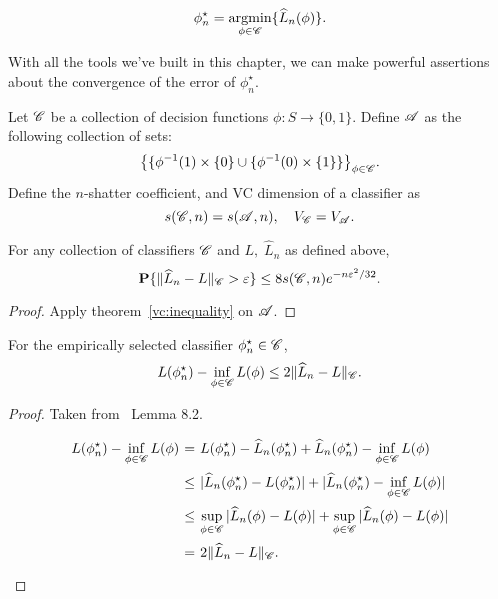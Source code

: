 \[ \phi_n^\star = \underset{\phi\in\CC}{\text{argmin}} \{\widehat{L}_n(\phi)\}. \] 

With all the tools we've built in this chapter, we can make powerful assertions about the convergence of the error of $\phi_n^\star$.

\begin{definition}
    Let $\CC$ be a collection of decision functions $\phi: S \to \{0,1\}$. Define $\AA$ as the following collection of sets:
    \[ {\left\{\{\phi^{-1}(1)\times\{0\}\cup\{\phi^{-1}(0)\times\{1\}\}\right\}}_{\phi \in \CC}. \]
    Define the $n$-shatter coefficient, and VC dimension of a classifier as
    \[ s(\CC,n) = s(\AA,n),\hspace*{1em} V_\CC = V_\AA. \] 
\end{definition}

\begin{theorem}
    For any collection of classifiers $\CC$ and $L,\;\widehat{L}_n $ as defined above,
    \[ \P \{\|\widehat{L}_n - L\|_\CC > \varepsilon\} \leq 8 s(\CC,n) e^{-n\varepsilon^2/32}. \] 
\end{theorem}

\begin{proof}
    Apply {theorem}~\ref{vc:inequality} on $\AA$.
\end{proof}

\begin{theorem}
    For the empirically selected classifier $\phi_n^\star \in \CC$,
    \[ L(\phi_n^\star) - \inf_{\phi\in \CC} L(\phi) \leq 2 \|\widehat{L}_n - L\|_\CC.\] 
\end{theorem}

\begin{proof}
    Taken from~\cite{devroye2013probabilistic} Lemma 8.2.
    \[\everymath{\displaystyle}\arraycolsep=1.8pt\def\arraystretch{1.8}
        \begin{array}{rcl}
            L(\phi_n^\star) - \inf_{\phi\in \CC} L(\phi) & = & L(\phi_n^\star) - \widehat{L}_n(\phi_n^\star) + \widehat{L}_n(\phi_n^\star) - \inf_{\phi\in \CC} L(\phi)\\
            & \leq & |\widehat{L}_n(\phi_n^\star) - L(\phi_n^\star)| + |\widehat{L}_n(\phi_n^\star) - \inf_{\phi\in \CC} L(\phi)|\\
            & \leq & \sup_{\phi\in\CC}|\widehat{L}_n(\phi) - L(\phi)| + \sup_{\phi\in\CC}|\widehat{L}_n(\phi) - L(\phi)|\\
            & = & 2 \|\widehat{L}_n - L\|_\CC.
        \end{array}
    \] 
\end{proof}

